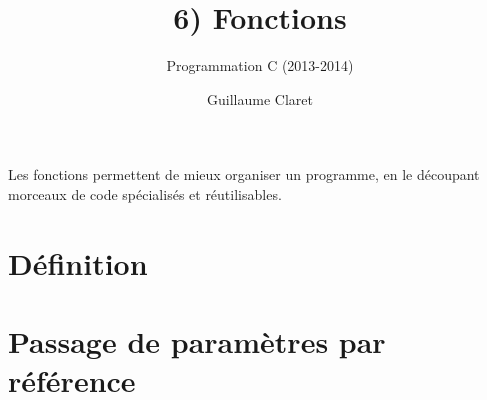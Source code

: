 \documentclass[a4paper,10pt]{article}
\begin{document}
  \title{6) Fonctions}
  \author{Programmation C (2013-2014)}
  \date{Guillaume Claret}
  \maketitle
  
  Les fonctions permettent de mieux organiser un programme, en le découpant morceaux de code spécialisés et réutilisables.
  
  \section{Définition}
  
  \section{Passage de paramètres par référence}
\end{document}
